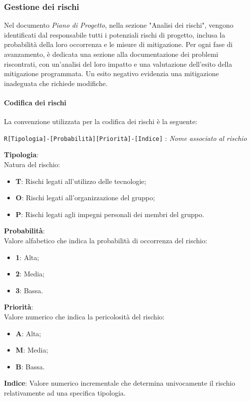 \subsubsection{Gestione dei rischi}
Nel documento \textit{Piano di Progetto}, nella sezione "Analisi dei rischi", vengono identificati dal responsabile tutti i potenziali rischi di progetto, inclusa la probabilità della loro occorrenza e le misure di mitigazione. Per ogni fase di avanzamento, è dedicata una sezione alla documentazione dei problemi riscontrati, con un'analisi del loro impatto e una valutazione dell'esito della mitigazione programmata. Un esito negativo evidenzia una mitigazione inadeguata che richiede modifiche.

\paragraph{Codifica dei rischi}
La convenzione utilizzata per la codifica dei rischi è la seguente: 
\begin{center}
    \texttt{R[Tipologia]-[Probabilità][Priorità]-[Indice]} : \textit{Nome associato al rischio}
\end{center} 

\begin{flushleft}
    \textbf{Tipologia}: \\
    Natura del rischio:
    \begin{itemize}
        \item \textbf{T}: Rischi legati all'utilizzo delle tecnologie;
        \item \textbf{O}: Rischi legati all'organizzazione del gruppo;
        \item \textbf{P}: Rischi legati agli impegni personali dei membri del gruppo.
    \end{itemize}
    \textbf{Probabilità}: \\
    Valore alfabetico che indica la probabilità di occorrenza del rischio:
    \begin{itemize}
        \item \textbf{1}: Alta;
        \item \textbf{2}: Media; 
        \item \textbf{3}: Bassa.
    \end{itemize}
    \textbf{Priorità}: \\
    Valore numerico che indica la pericolosità del rischio:
    \begin{itemize}
        \item \textbf{A}: Alta;
        \item \textbf{M}: Media;
        \item \textbf{B}: Bassa.
    \end{itemize}
    \textbf{Indice}: Valore numerico incrementale che determina univocamente il rischio relativamente ad una specifica tipologia.
\end{flushleft}

